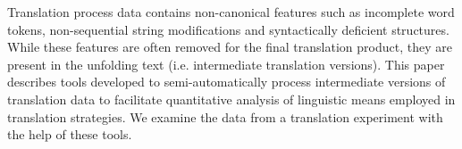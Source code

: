 Translation process data contains non-canonical features such as incomplete word tokens, non-sequential string modifications and syntactically deficient structures. While these features are often removed for the final translation product, they are present in the unfolding text (i.e. intermediate translation versions). This paper describes tools developed to semi-automatically process intermediate versions of translation data to facilitate quantitative analysis of linguistic means employed in translation strategies. We examine the data from a translation experiment with the help of these tools.
